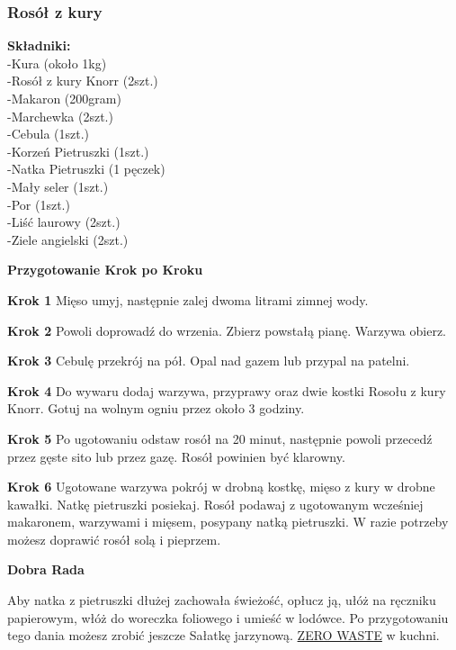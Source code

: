 \documentclass[12pt, letterpaper, titlepage]{article}
\begin{document}
\subsubsection{Rosół z kury}
\textbf{Składniki:}\\-Kura (około 1kg)\\-Rosół z kury Knorr (2szt.)\\-Makaron (200gram)\\-Marchewka (2szt.)\\-Cebula (1szt.)\\-Korzeń Pietruszki (1szt.)\\-Natka Pietruszki (1 pęczek)\\-Mały seler (1szt.)\\-Por (1szt.)\\-Liść laurowy (2szt.)\\-Ziele angielski (2szt.)
\begin{flushleft}
\begin{center}
\textbf{Przygotowanie Krok po Kroku}
\end{center}
\textbf{Krok 1}
Mięso umyj, następnie zalej dwoma litrami zimnej wody.
\end{flushleft}
\begin{flushleft}
\textbf{Krok 2}
Powoli doprowadź do wrzenia. Zbierz powstałą pianę. Warzywa obierz.
\end{flushleft}
\begin{flushleft}
\textbf{Krok 3}
Cebulę przekrój na pół. Opal nad gazem lub przypal na patelni.
\end{flushleft}
\begin{flushleft}
\textbf{Krok 4}
Do wywaru dodaj warzywa, przyprawy oraz dwie kostki Rosołu z kury Knorr. Gotuj na wolnym ogniu przez około 3 godziny.
\end{flushleft}
\begin{flushleft}
\textbf{Krok 5}
Po ugotowaniu odstaw rosół na 20 minut, następnie powoli przecedź przez gęste sito lub przez gazę. Rosół powinien być klarowny.
\end{flushleft}
\begin{flushleft}
\textbf{Krok 6}
Ugotowane warzywa pokrój w drobną kostkę, mięso z kury w drobne kawałki. Natkę pietruszki posiekaj. Rosół podawaj z ugotowanym wcześniej makaronem, warzywami i mięsem, posypany natką pietruszki. W razie potrzeby możesz doprawić rosół solą i pieprzem.
\end{flushleft}
\begin{center}
\textbf{Dobra Rada}
\end{center}
Aby natka z pietruszki dłużej zachowała świeżość, opłucz ją, ułóż na ręczniku papierowym, włóż do woreczka foliowego i umieść w lodówce. Po przygotowaniu tego dania możesz zrobić jeszcze Sałatkę jarzynową. \underline{ZERO WASTE} w kuchni.
\newpage
\end{document}

